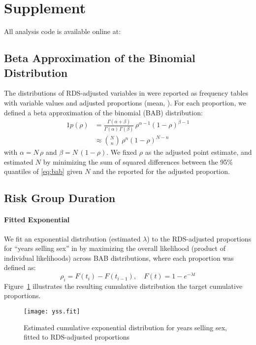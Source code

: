 \section{Supplement}
All analysis code is available online at:
\subsection{Beta Approximation of the Binomial Distribution}\label{app.bab}
The distributions of RDS-adjusted variables in \cite{Baral2014} were reported as
frequency tables with variable values and adjusted proportions (mean, \ci).
For each proportion, we defined a beta approximation of the binomial (BAB) distribution:
\begin{alignat}{1}\label{eq:bab}
  p(\rho) &=
    \frac{\Gamma(\alpha+\beta)}{\Gamma(\alpha)\,\Gamma(\beta)}\,
    \rho^{\alpha-1}{(1 - \rho)}^{\beta-1} \\
    &\approx {N \choose n} \, \rho^{n}{(1 - \rho)}^{N - n} \nonumber
\end{alignat}
with $\alpha = N\,\rho$ and $\beta = N\,(1-\rho)$.
We fixed $\rho$ as the adjusted point estimate,
and estimated $N$ by minimizing the sum of squared differences between
the 95\% quantiles of \eqref{eq:bab} given $N$ and the reported \ci for the adjusted proportion.
\subsection{Risk Group Duration}\label{app.yss}
\paragraph{Fitted Exponential}
We fit an exponential distribution (\ie estimated $\lambda$) to the RDS-adjusted proportions for
``years selling sex'' in \cite{Baral2014} by
maximizing the overall likelihood (product of individual likelihoods) across BAB distributions,
where each proportion was defined as:
\begin{equation}
  \rho_i = F(t_i) - F(t_{i-1}), \quad F(t) = 1 - e^{-\lambda t}
\end{equation}
Figure~\ref{fig:yss.fit} illustrates the resulting cumulative distribution \vs
the target cumulative proportions.
\begin{figure}[h]
	\centering\texttt{[image: yss.fit]}
  \caption{Estimated cumulative exponential distribution for years selling sex,
    fitted to RDS-adjusted proportions}
	\label{fig:yss.fit}
\end{figure}
